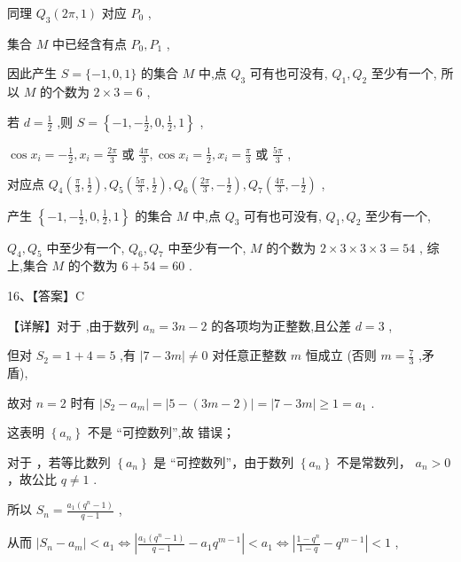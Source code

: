 \documentclass[10pt]{article}
\newcommand*\circled[1]{\tikz[baseline=(char.base)]{\node[shape=circle,draw,inner sep=1.5pt] (char) {\small #1};}}
\begin{document}
同理 \({Q}_{3}\left( {{2\pi },1}\right)\) 对应 \({P}_{0}\) ,

集合 \(M\) 中已经含有点 \({P}_{0},{P}_{1}\) ,

因此产生 \(S = \{  - 1,0,1\}\) 的集合 \(M\) 中,点 \({Q}_{3}\) 可有也可没有, \({Q}_{1},{Q}_{2}\) 至少有一个, 所以 \(M\) 的个数为 \(2 \times  3 = 6\) ,

若 \(d = \frac{1}{2}\) ,则 \(S = \left\{  {-1, - \frac{1}{2},0,\frac{1}{2},1}\right\}\) ,

\(\cos {x}_{i} =  - \frac{1}{2},{x}_{i} = \frac{2\pi }{3}\) 或 \(\frac{4\pi }{3},\cos {x}_{i} = \frac{1}{2},{x}_{i} = \frac{\pi }{3}\) 或 \(\frac{5\pi }{3}\) ,

对应点 \({Q}_{4}\left( {\frac{\pi }{3},\frac{1}{2}}\right) ,{Q}_{5}\left( {\frac{5\pi }{3},\frac{1}{2}}\right) ,{Q}_{6}\left( {\frac{2\pi }{3}, - \frac{1}{2}}\right) ,{Q}_{7}\left( {\frac{4\pi }{3}, - \frac{1}{2}}\right)\) ,

产生 \(\left\{  {-1, - \frac{1}{2},0,\frac{1}{2},1}\right\}\) 的集合 \(M\) 中,点 \({Q}_{3}\) 可有也可没有, \({Q}_{1},{Q}_{2}\) 至少有一个,

\({Q}_{4},{Q}_{5}\) 中至少有一个, \({Q}_{6},{Q}_{7}\) 中至少有一个, \(M\) 的个数为 \(2 \times  3 \times  3 \times  3 = {54}\) , 综上,集合 \(M\) 的个数为 \(6 + {54} = {60}\) .

16、【答案】C

【详解】对于 \circled{1} ,由于数列 \({a}_{n} = {3n} - 2\) 的各项均为正整数,且公差 \(d = 3\) ,

但对 \({S}_{2} = 1 + 4 = 5\) ,有 \(\left| {7 - {3m}}\right|  \neq  0\) 对任意正整数 \(m\) 恒成立 (否则 \(m = \frac{7}{3}\) ,矛盾),

故对 \(n = 2\) 时有 \(\left| {{S}_{2} - {a}_{m}}\right|  = \left| {5 - \left( {{3m} - 2}\right) }\right|  = \left| {7 - {3m}}\right|  \geq  1 = {a}_{1}\) .

这表明 \(\left\{  {a}_{n}\right\}\) 不是 “可控数列”,故 \circled{1} 错误；

对于 \circled{2} ，若等比数列 \(\left\{  {a}_{n}\right\}\) 是 “可控数列”，由于数列 \(\left\{  {a}_{n}\right\}\) 不是常数列， \({a}_{n} > 0\) ，故公比 \(q \neq  1\) .

所以 \({S}_{n} = \frac{{a}_{1}\left( {{q}^{n} - 1}\right) }{q - 1}\) ,

从而 \(\left| {{S}_{n} - {a}_{m}}\right|  < {a}_{1} \Leftrightarrow  \left| {\frac{{a}_{1}\left( {{q}^{n} - 1}\right) }{q - 1} - {a}_{1}{q}^{m - 1}}\right|  < {a}_{1} \Leftrightarrow  \left| {\frac{1 - {q}^{n}}{1 - q} - {q}^{m - 1}}\right|  < 1\) ,
\end{document}
